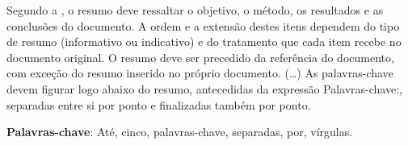 \documentclass[12pt, %
openright, 
oneside, %
a4paper,    %
brazil]{facom-ufu-abntex2}
\begin{document}





\begin{resumo} %
 Segundo a , o resumo deve ressaltar o
 objetivo, o método, os resultados e as conclusões do documento. A ordem e a extensão
 destes itens dependem do tipo de resumo (informativo ou indicativo) e do
 tratamento que cada item recebe no documento original. O resumo deve ser
 precedido da referência do documento, com exceção do resumo inserido no
 próprio documento. (\ldots) As palavras-chave devem figurar logo abaixo do
 resumo, antecedidas da expressão Palavras-chave:, separadas entre si por
 ponto e finalizadas também por ponto.

 \vspace{\onelineskip}
    
 \noindent
 \textbf{Palavras-chave}: Até, cinco, palavras-chave, separadas, por, vírgulas. %
\end{resumo}

\listoffigures*
\cleardoublepage

\listoftables*
\cleardoublepage
\end{document}
